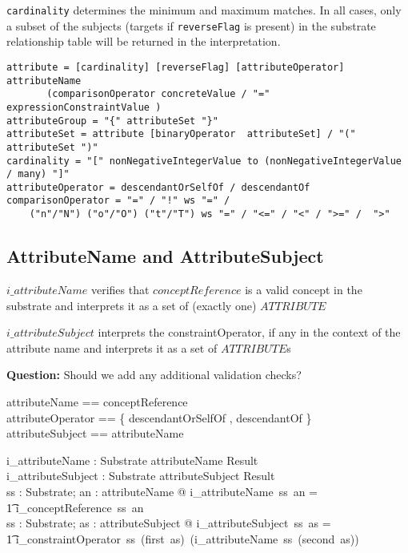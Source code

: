 \documentclass{article}
\def\spec#1{{\tt #1}}
\begin{document}
\spec{cardinality} determines the minimum and maximum matches.  In all cases, only a subset of the subjects 
(targets if \spec{reverseFlag} is present) in the substrate relationship table will be returned in the interpretation.



\begin{verbatim}
attribute = [cardinality] [reverseFlag] [attributeOperator] attributeName 			
       (comparisonOperator concreteValue / "=" expressionConstraintValue )
attributeGroup = "{" attributeSet "}" 
attributeSet = attribute [binaryOperator  attributeSet] / "(" attributeSet ")" 
cardinality = "[" nonNegativeIntegerValue to (nonNegativeIntegerValue / many) "]" 
attributeOperator = descendantOrSelfOf / descendantOf 
comparisonOperator = "=" / "!" ws "=" / 
    ("n"/"N") ("o"/"O") ("t"/"T") ws "=" / "<=" / "<" / ">=" /  ">"
\end{verbatim}

\subsection{AttributeName and AttributeSubject}
$i\_attributeName$ verifies that  $conceptReference$ is a valid concept in the substrate and
interprets it as a set of (exactly one) $ATTRIBUTE$

$i\_attributeSubject$ interprets the constraintOperator, if any in the context of the attribute name and
interprets it as a set of $ATTRIBUTE$s

\textbf{Question:} Should we add any additional validation checks?
\begin{zed}
attributeName == conceptReference \\
\also
attributeOperator ==  \{ descendantOrSelfOf , descendantOf \} \\
attributeSubject == \optional[attributeOperator] \cross attributeName 
\end{zed}

\begin{gendef}
   i\_attributeName : Substrate \pfun attributeName \pfun Result \\
   i\_attributeSubject : Substrate \pfun attributeSubject \pfun Result \\
\where
   \forall ss : Substrate; an : attributeName @ i\_attributeName~ss~an = \\
\t1 i\_conceptReference~ss~an \\
\also
   \forall ss : Substrate; as : attributeSubject @ i\_attributeSubject~ss~as = \\
\t1 i\_constraintOperator~ss~(first~as)~(i\_attributeName~ss~(second~as)) \\
\end{gendef}
\end{document}
